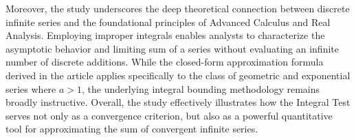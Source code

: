 \documentclass[11pt, a4paper]{article}
\begin{document}
Moreover, the study underscores the deep theoretical connection between discrete infinite series and the foundational principles of Advanced Calculus and Real Analysis. Employing improper integrals enables analysts to characterize the asymptotic behavior and limiting sum of a series without evaluating an infinite number of discrete additions. While the closed-form approximation formula derived in the article applies specifically to the class of geometric and exponential series where $a > 1$, the underlying integral bounding methodology remains broadly instructive. Overall, the study effectively illustrates how the Integral Test serves not only as a convergence criterion, but also as a powerful quantitative tool for approximating the sum of convergent infinite series.
\end{document}
